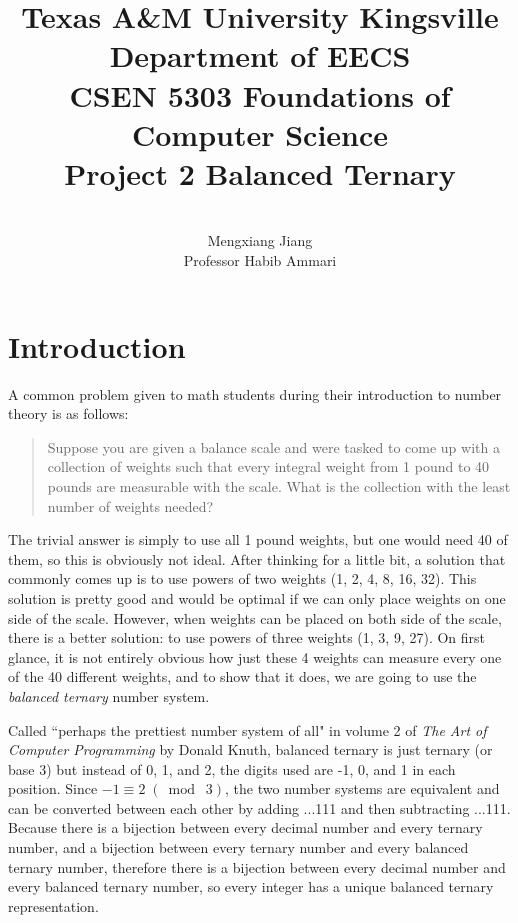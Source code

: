\documentclass[12pt]{report}
\begin{document}
 
 
\title{Texas A\&M University Kingsville\\
Department of EECS\\
CSEN 5303 Foundations of Computer Science\\
Project 2 Balanced Ternary
}%
\author{\\
Mengxiang Jiang\\ %
Professor Habib Ammari} %
 
\maketitle

\tableofcontents

\chapter{Introduction}
A common problem given to math students during their introduction to number theory is as follows:

\begin{quotation}
Suppose you are given a balance scale and were tasked to come up with a collection of weights such that every integral
weight from 1 pound to 40 pounds are measurable with the scale. What is the collection with the least number of weights needed?
\end{quotation}

The trivial answer is simply to use all 1 pound weights, but one would need 40 of them, so this is obviously not ideal.
After thinking for a little bit, a solution that commonly comes up is to use powers of two weights (1, 2, 4, 8, 16, 32).
This solution is pretty good and would be optimal if we can only place weights on one side of the scale. 
However, when weights can be placed on both side of the scale, there is a better solution: to use powers of three weights (1, 3, 9, 27).
On first glance, it is not entirely obvious how just these 4 weights can measure every one of the 40 different weights, 
and to show that it does, we are going to use the \emph{balanced ternary} number system.

Called ``perhaps the prettiest number system of all" in volume 2 of \emph{The Art of Computer Programming} by Donald Knuth, 
balanced ternary is just ternary (or base 3) but instead of 0, 1, and 2, the digits used are -1, 0, and 1 in each position.\cite{aocp2}
Since $-1 \equiv 2 \;(\bmod\; 3)$, the two number systems are equivalent and can be converted between each other by adding ...111 and then subtracting ...111.\cite{aocp2}
Because there is a bijection between every decimal number and every ternary number, and a bijection between every ternary number and every balanced ternary number, 
therefore there is a bijection between every decimal number and every balanced ternary number, so every integer has a unique balanced ternary representation.
\end{document}
